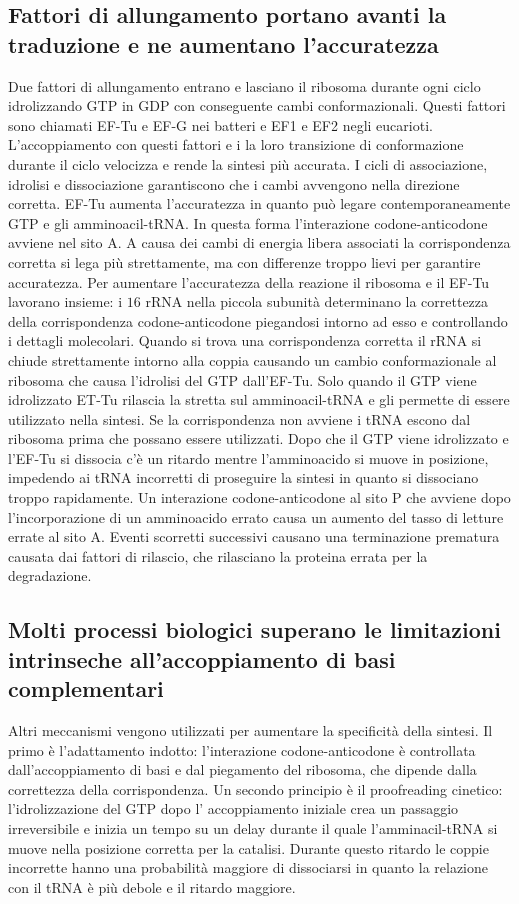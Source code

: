 \subsection{Fattori di allungamento portano avanti la traduzione e ne aumentano l'accuratezza}
Due fattori di allungamento entrano e lasciano il ribosoma durante ogni ciclo idrolizzando GTP in GDP con conseguente cambi conformazionali. Questi fattori sono chiamati EF-Tu e EF-G nei
batteri e EF1 e EF2 negli eucarioti. L'accoppiamento con questi fattori e i la loro transizione di conformazione durante il ciclo velocizza e rende la sintesi pi\`u accurata. I cicli di
associazione, idrolisi e dissociazione garantiscono che i cambi avvengono nella direzione corretta. EF-Tu aumenta l'accuratezza in quanto pu\`o legare contemporaneamente GTP e gli 
amminoacil-tRNA. In questa forma l'interazione codone-anticodone avviene nel sito A. A causa dei cambi di energia libera associati la corrispondenza corretta si lega pi\`u strettamente,
ma con differenze troppo lievi per garantire accuratezza. Per aumentare l'accuratezza della reazione il ribosoma e il EF-Tu lavorano insieme: i $16$ rRNA nella piccola subunit\`a 
determinano la correttezza della corrispondenza codone-anticodone piegandosi intorno ad esso e controllando i dettagli molecolari. Quando si trova una corrispondenza corretta il rRNA
si chiude strettamente intorno alla coppia causando un cambio conformazionale al ribosoma che causa l'idrolisi del GTP dall'EF-Tu. Solo quando il GTP viene idrolizzato  ET-Tu rilascia 
la stretta sul amminoacil-tRNA e gli permette di essere utilizzato nella sintesi. Se la corrispondenza non avviene i tRNA escono dal ribosoma prima che possano essere utilizzati. Dopo
che il GTP viene idrolizzato e l'EF-Tu si dissocia c'\`e un ritardo mentre l'amminoacido si muove in posizione, impedendo ai tRNA incorretti di proseguire la sintesi in quanto si
dissociano troppo rapidamente. Un interazione codone-anticodone al sito P che avviene dopo l'incorporazione di un amminoacido errato causa un aumento del tasso di letture errate al 
sito A. Eventi scorretti successivi causano una terminazione prematura causata dai fattori di rilascio, che rilasciano la proteina errata per la degradazione. 
\subsection{Molti processi biologici superano le limitazioni intrinseche all'accoppiamento di basi complementari}
Altri meccanismi vengono utilizzati per aumentare la specificit\`a della sintesi. Il primo \`e l'adattamento indotto: l'interazione codone-anticodone \`e controllata dall'accoppiamento
di basi e dal piegamento del ribosoma, che dipende dalla correttezza della corrispondenza. Un secondo principio \`e il proofreading cinetico: l'idrolizzazione del GTP dopo l'
accoppiamento iniziale crea un passaggio irreversibile e inizia un tempo su un delay durante il quale l'amminacil-tRNA si muove nella posizione corretta per la catalisi. Durante questo
ritardo le coppie incorrette hanno una probabilit\`a maggiore di dissociarsi in quanto la relazione con il tRNA \`e pi\`u debole e il ritardo maggiore. 
